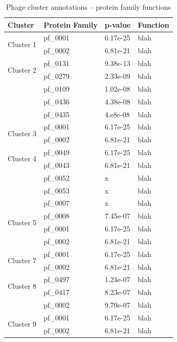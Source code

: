 \begin{table}[t]
    \caption{Phage cluster annotations -- protein family functions}
    \centering
    \scriptsize
    \begin{tabular}{llll}
    \toprule
    Cluster & Protein Family & p-value & Function \\
    \midrule
    \multirow{2}{*}{Cluster 1} & pf\_0001 & 6.17e-25 & blah \\
                               & pf\_0002 & 6.81e-21 & blah \\
    \midrule
    \multirow{2}{*}{Cluster 2} & pf\_0131 & 9.38e-13 & blah \\
                               & pf\_0279 & 2.33e-09 & blah \\
                               & pf\_0109 & 1.02e-08 & blah \\
                               & pf\_0436 & 4.38e-08 & blah \\
                               & pf\_0435 & 4.e8e-08 & blah \\
    \midrule
    \multirow{2}{*}{Cluster 3} & pf\_0001 & 6.17e-25 & blah \\
                               & pf\_0002 & 6.81e-21 & blah \\
    \midrule
    \multirow{2}{*}{Cluster 4} & pf\_0049 & 6.17e-25 & blah \\
                               & pf\_0043 & 6.81e-21 & blah \\
                               & pf\_0052 & x        & blah \\
                               & pf\_0053 & x        & blah \\
                               & pf\_0007 & x        & blah \\
    \midrule
    \multirow{2}{*}{Cluster 5} & pf\_0008 & 7.45e-07 & blah \\
    \midrule
    \multirow{2}{*}{Cluster 6} & pf\_0001 & 6.17e-25 & blah \\
                               & pf\_0002 & 6.81e-21 & blah \\
    \midrule
    \multirow{2}{*}{Cluster 7} & pf\_0001 & 6.17e-25 & blah \\
                               & pf\_0002 & 6.81e-21 & blah \\
    \midrule
    \multirow{2}{*}{Cluster 8} & pf\_0497 & 1.24e-07 & blah \\
                               & pf\_0417 & 8.23e-07 & blah \\
                               & pf\_0002 & 9.70e-07 & blah \\
    \midrule
    \multirow{2}{*}{Cluster 9} & pf\_0001 & 6.17e-25 & blah \\
                               & pf\_0002 & 6.81e-21 & blah \\
    \bottomrule
    \end{tabular}
    \label{phage:table:cluster_functions}
\end{table}


